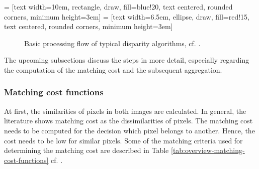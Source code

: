  = [text width=10em, rectangle, draw, fill=blue!20, text centered, rounded corners, minimum height=3em]
 = [text width=6.5em, ellipse, draw, fill=red!15, text centered, rounded corners, minimum height=3em]
\begin{figure}[h!]
  \centering
  \caption[Basic processing flow of typical disparity algorithms]{Basic processing flow of typical disparity algorithms, cf. \citep{cyganek2011introduction, scharstein2002taxonomy}.}
  \label{fig:disparity-flow}
\end{figure}

\noindent The upcoming subsections discuss the steps in more detail, especially regarding the computation of the matching cost and the subsequent aggregation.

\newpage

\subsubsection{Matching cost functions}

At first, the similarities of pixels in both images are calculated.
In general, the literature shows matching cost as the dissimilarities of pixels.
The matching cost needs to be computed for the decision which pixel belongs to another.
Hence, the cost needs to be low for similar pixels.
Some of the matching criteria used for determining the matching cost are described in Table \ref{tab:overview-matching-cost-functions} cf. \citep{cyganek2011introduction, scharstein2002taxonomy, opencv_library, kanade1995development, hamzah2010sum}.

